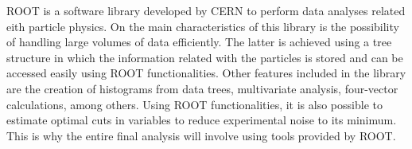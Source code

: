 ROOT is a software library developed by CERN to perform data analyses related eith particle physics. On the main characteristics of this library is the possibility of handling large volumes of data efficiently. The latter is achieved using a tree structure in which the information related with the particles is stored and can be accessed easily using ROOT functionalities. Other features included in the library are the creation of histograms from data trees, multivariate analysis, four-vector calculations, among others. Using ROOT functionalities, it is also possible to estimate optimal cuts in variables to reduce experimental noise to its minimum. This is why the entire final analysis will involve using tools provided by ROOT.
